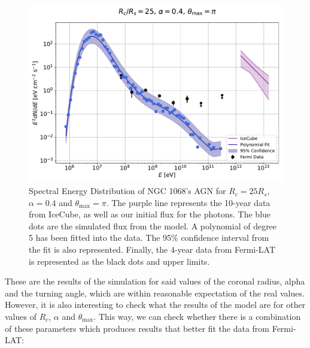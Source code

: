 \begin{figure}[H]
    \includegraphics[width=\textwidth]{Figures/example_simulation_plot.pdf}
    \centering
    \caption{Spectral Energy Distribution of NGC 1068's AGN for $R_c=25R_s$, $\alpha=0.4$ and $\theta_{\max} = \pi$. The purple line represents the 10-year data from IceCube, as well as our initial flux for the photons. The blue dots are the simulated flux from the model. A polynomial of degree 5 has been fitted into the data. The 95\% confidence interval from the fit is also represented. Finally, the 4-year data from Fermi-LAT is represented as the black dots and upper limits.}
    \label{fig:example_simulation_plot}
\end{figure}

These are the results of the simulation for said values of the coronal radius, alpha and the turning angle, which are within reasonable expectation of the real values. However, it is also interesting to check what the results of the model are for other values of $R_c$, $\alpha$ and $\theta_{\max}$. This way, we can check whether there is a combination of these parameters which produces results that better fit the data from Fermi-LAT:

